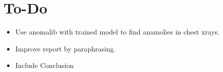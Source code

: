 \section{To-Do}

\begin{itemize}
    \item Use anomalib with trained model to find anamolies in chest xrays. 
    \item Improve report by paraphrasing.
    \item Include Conclusion
\end{itemize}